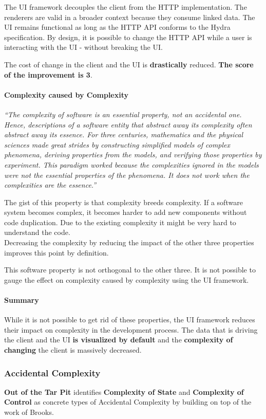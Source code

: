 The UI framework decouples the client from the HTTP implementation. The renderers are valid in a broader context because they consume linked data. The UI remains functional as long as the HTTP API conforms to the Hydra specification. By design, it is possible to change the HTTP API while a user is interacting with the UI - without breaking the UI.

The cost of change in the client and the UI is \textbf{drastically} reduced. \textbf{The score of the improvement is 3}.

\paragraph{Complexity caused by Complexity}
\textit{``The complexity of software is an essential property, not an accidental one. Hence, descriptions of a software entity that abstract away its complexity often abstract away its essence. For three centuries, mathematics and the physical sciences made great strides by constructing simplified models of complex phenomena, deriving properties from the models, and verifying those properties by experiment. This paradigm worked because the complexities ignored in the models were not the essential properties of the phenomena. It does not work when the complexities are the essence.''} \citep[p.~3]{nosilverbullet}

The gist of this property is that complexity breeds complexity. If a software system becomes complex, it becomes harder to add new components without code duplication. Due to the existing complexity it might be very hard to understand the code. \\ Decreasing the complexity by reducing the impact of the other three properties improves this point by definition.

This software property is not orthogonal to the other three. It is not possible to gauge the effect on complexity caused by complexity using the UI framework.

\paragraph{Summary}
While it is not possible to get rid of these properties, the UI framework reduces their impact on complexity in the development process. The data that is driving the client and the UI \textbf{is visualized by default} and the \textbf{complexity of changing} the client is massively decreased.

\subsubsection{Accidental Complexity}
\textbf{Out of the Tar Pit} identifies \textbf{Complexity of State} and \textbf{Complexity of Control} as concrete types of Accidental Complexity by building on top of the work of Brooks.

